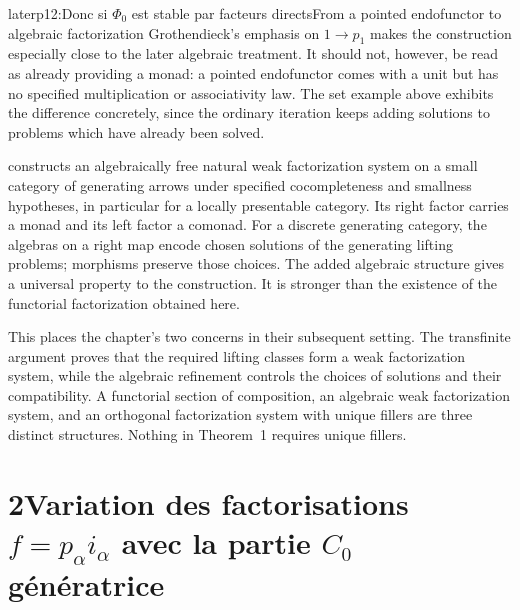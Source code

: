 \begin{dcomment}{later}{p12:Donc si $\Phi_0$ est stable par facteurs directs}{From a pointed endofunctor to algebraic factorization}
Grothendieck's emphasis on $1\to p_1$ makes the construction especially close to the later algebraic treatment. It should not, however, be read as already providing a monad: a pointed endofunctor comes with a unit but has no specified multiplication or associativity law. The set example above exhibits the difference concretely, since the ordinary iteration keeps adding solutions to problems which have already been solved.

\citet[Theorem~4.4]{Garner2009} constructs an algebraically free natural weak factorization system on a small category of generating arrows under specified cocompleteness and smallness hypotheses, in particular for a locally presentable category. Its right factor carries a monad and its left factor a comonad. For a discrete generating category, the algebras on a right map encode chosen solutions of the generating lifting problems; morphisms preserve those choices. The added algebraic structure gives a universal property to the construction. It is stronger than the existence of the functorial factorization obtained here.

This places the chapter's two concerns in their subsequent setting. The transfinite argument proves that the required lifting classes form a weak factorization system, while the algebraic refinement controls the choices of solutions and their compatibility. A functorial section of composition, an algebraic weak factorization system, and an orthogonal factorization system with unique fillers are three distinct structures. Nothing in Theorem~1 requires unique fillers.
\end{dcomment}



\section*{2\quad Variation des factorisations $f=p_\alpha i_\alpha$ avec la partie $C_0$ génératrice}

